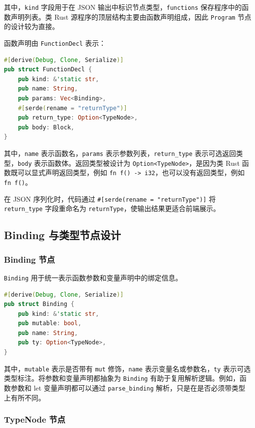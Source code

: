 \documentclass[UTF8,a4paper,12pt]{ctexart}
\begin{document}
其中，\texttt{kind} 字段用于在 JSON 输出中标识节点类型，\texttt{functions} 保存程序中的函数声明列表。类 Rust 源程序的顶层结构主要由函数声明组成，因此 \texttt{Program} 节点的设计较为直接。

函数声明由 \texttt{FunctionDecl} 表示：

\begin{lstlisting}[language=Rust,caption={FunctionDecl 节点定义}]
#[derive(Debug, Clone, Serialize)]
pub struct FunctionDecl {
    pub kind: &'static str,
    pub name: String,
    pub params: Vec<Binding>,
    #[serde(rename = "returnType")]
    pub return_type: Option<TypeNode>,
    pub body: Block,
}
\end{lstlisting}

其中，\texttt{name} 表示函数名，\texttt{params} 表示参数列表，\texttt{return\_type} 表示可选返回类型，\texttt{body} 表示函数体。返回类型被设计为 \texttt{Option<TypeNode>}，是因为类 Rust 函数既可以显式声明返回类型，例如 \texttt{fn f() -> i32}，也可以没有返回类型，例如 \texttt{fn f()}。

在 JSON 序列化时，代码通过 \texttt{\#[serde(rename = "returnType")]} 将 \texttt{return\_type} 字段重命名为 \texttt{returnType}，使输出结果更适合前端展示。

\subsection{Binding 与类型节点设计}

\subsubsection{Binding 节点}

\texttt{Binding} 用于统一表示函数参数和变量声明中的绑定信息。

\begin{lstlisting}[language=Rust,caption={Binding 节点定义}]
#[derive(Debug, Clone, Serialize)]
pub struct Binding {
    pub kind: &'static str,
    pub mutable: bool,
    pub name: String,
    pub ty: Option<TypeNode>,
}
\end{lstlisting}

其中，\texttt{mutable} 表示是否带有 \texttt{mut} 修饰，\texttt{name} 表示变量名或参数名，\texttt{ty} 表示可选类型标注。将参数和变量声明都抽象为 \texttt{Binding} 有助于复用解析逻辑。例如，函数参数和 let 变量声明都可以通过 \texttt{parse\_binding} 解析，只是在是否必须带类型上有所不同。

\subsubsection{TypeNode 节点}
\end{document}
